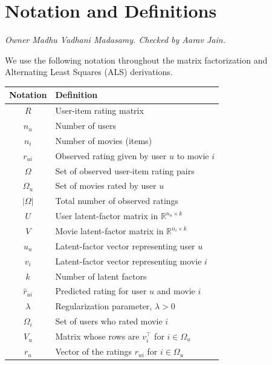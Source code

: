

\section{Notation and Definitions}
\textit{Owner Madhu Vadhani Madasamy. Checked by Aarav Jain.}


We use the following notation throughout the matrix
factorization and Alternating Least Squares (ALS) derivations.

\begin{table}[h]
\centering
\begin{tabular}{|c|l|}
\hline
\textbf{Notation} & \textbf{Definition} \\
\hline
$R$ & User-item rating matrix \\
$n_u$ & Number of users \\
$n_i$ & Number of movies (items) \\
$r_{ui}$ & Observed rating given by user $u$ to movie $i$ \\
$\Omega$ & Set of observed user-item rating pairs \\
$\Omega_u$ & Set of movies rated by user $u$ \\
$|\Omega|$ & Total number of observed ratings \\
$U$ & User latent-factor matrix in $\mathbb{R}^{n_u \times k}$ \\
$V$ & Movie latent-factor matrix in $\mathbb{R}^{n_i \times k}$ \\
$u_u$ & Latent-factor vector representing user $u$ \\
$v_i$ & Latent-factor vector representing movie $i$ \\
$k$ & Number of latent factors \\
$\hat r_{ui}$ & Predicted rating for user $u$ and movie $i$ \\
$\lambda$ & Regularization parameter, $\lambda > 0$ \\
$\Omega_i$ & Set of users who rated movie $i$ \\
$V_u$ & Matrix whose rows are $v_i^\top$ for $i\in\Omega_u$ \\
$r_u$ & Vector of the ratings $r_{ui}$ for $i\in\Omega_u$ \\

\end{tabular}
\end{table}
